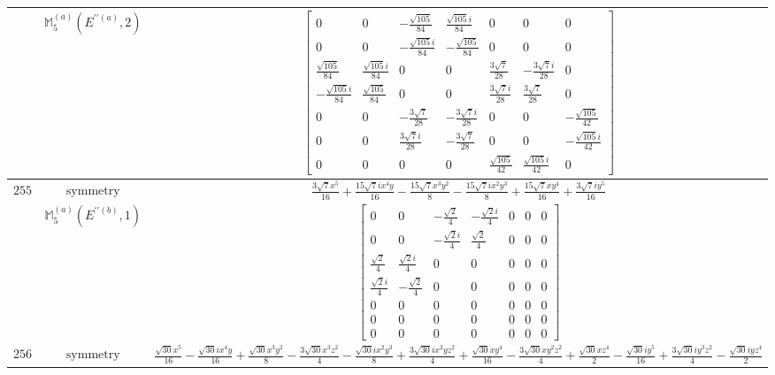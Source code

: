\documentclass[fleqn,8pt,landscape]{jsarticle}
\begin{document}
\begin{longtable}{ccc}
$  $ & $ \mathbb{M}_{5}^{(a)}(E^{\prime\prime(a)},2) $ & $ \begin{bmatrix} 0 & 0 & - \frac{\sqrt{105}}{84} & \frac{\sqrt{105} i}{84} & 0 & 0 & 0 \\ 0 & 0 & - \frac{\sqrt{105} i}{84} & - \frac{\sqrt{105}}{84} & 0 & 0 & 0 \\ \frac{\sqrt{105}}{84} & \frac{\sqrt{105} i}{84} & 0 & 0 & \frac{3 \sqrt{7}}{28} & - \frac{3 \sqrt{7} i}{28} & 0 \\ - \frac{\sqrt{105} i}{84} & \frac{\sqrt{105}}{84} & 0 & 0 & \frac{3 \sqrt{7} i}{28} & \frac{3 \sqrt{7}}{28} & 0 \\ 0 & 0 & - \frac{3 \sqrt{7}}{28} & - \frac{3 \sqrt{7} i}{28} & 0 & 0 & - \frac{\sqrt{105}}{42} \\ 0 & 0 & \frac{3 \sqrt{7} i}{28} & - \frac{3 \sqrt{7}}{28} & 0 & 0 & - \frac{\sqrt{105} i}{42} \\ 0 & 0 & 0 & 0 & \frac{\sqrt{105}}{42} & \frac{\sqrt{105} i}{42} & 0 \end{bmatrix} $ \\ \hline
$ 255 $ & $ \text{symmetry} $ & $ \frac{3 \sqrt{7} x^{5}}{16} + \frac{15 \sqrt{7} i x^{4} y}{16} - \frac{15 \sqrt{7} x^{3} y^{2}}{8} - \frac{15 \sqrt{7} i x^{2} y^{3}}{8} + \frac{15 \sqrt{7} x y^{4}}{16} + \frac{3 \sqrt{7} i y^{5}}{16} $ \\
$  $ & $ \mathbb{M}_{5}^{(a)}(E^{\prime\prime(b)},1) $ & $ \begin{bmatrix} 0 & 0 & - \frac{\sqrt{2}}{4} & - \frac{\sqrt{2} i}{4} & 0 & 0 & 0 \\ 0 & 0 & - \frac{\sqrt{2} i}{4} & \frac{\sqrt{2}}{4} & 0 & 0 & 0 \\ \frac{\sqrt{2}}{4} & \frac{\sqrt{2} i}{4} & 0 & 0 & 0 & 0 & 0 \\ \frac{\sqrt{2} i}{4} & - \frac{\sqrt{2}}{4} & 0 & 0 & 0 & 0 & 0 \\ 0 & 0 & 0 & 0 & 0 & 0 & 0 \\ 0 & 0 & 0 & 0 & 0 & 0 & 0 \\ 0 & 0 & 0 & 0 & 0 & 0 & 0 \end{bmatrix} $ \\ \hline
$ 256 $ & $ \text{symmetry} $ & $ \frac{\sqrt{30} x^{5}}{16} - \frac{\sqrt{30} i x^{4} y}{16} + \frac{\sqrt{30} x^{3} y^{2}}{8} - \frac{3 \sqrt{30} x^{3} z^{2}}{4} - \frac{\sqrt{30} i x^{2} y^{3}}{8} + \frac{3 \sqrt{30} i x^{2} y z^{2}}{4} + \frac{\sqrt{30} x y^{4}}{16} - \frac{3 \sqrt{30} x y^{2} z^{2}}{4} + \frac{\sqrt{30} x z^{4}}{2} - \frac{\sqrt{30} i y^{5}}{16} + \frac{3 \sqrt{30} i y^{3} z^{2}}{4} - \frac{\sqrt{30} i y z^{4}}{2} $ \\

\end{longtable}
\end{document}
